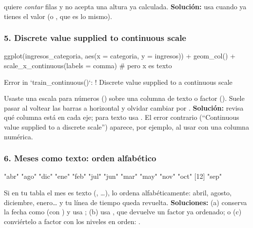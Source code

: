  quiere \emph{contar} filas y no acepta una altura ya
calculada. \textbf{Solución:} usa  cuando ya tienes el
valor (o , que es lo mismo).

\subsubsection{5. Discrete value supplied to continuous scale}

\begin{rnoejecutar}
ggplot(ingresos_categoria, aes(x = categoria, y = ingresos)) +
  geom_col() +
  scale_x_continuous(labels = comma)    # pero x es texto
\end{rnoejecutar}
\begin{rsalida}
Error in `train_continuous()`:
! Discrete value supplied to a continuous scale
\end{rsalida}

Usaste una escala para números () sobre una columna de
texto o factor (). Suele pasar al voltear las barras a
horizontal y olvidar cambiar  por
. \textbf{Solución:} revisa qué columna está en cada
eje; para texto usa . El error contrario
(``Continuous value supplied to a discrete scale'') aparece, por ejemplo, al
usar  con una columna numérica.

\subsubsection{6. Meses como texto: orden alfabético}

\begin{rsalida}
 [1] "abr" "ago" "dic" "ene" "feb" "jul" "jun" "mar" "may" "nov" "oct"
[12] "sep"
\end{rsalida}

Si en tu tabla el mes es texto (, \ldots),
 lo ordena alfabéticamente: abril, agosto, diciembre,
enero\ldots{} y tu línea de tiempo queda revuelta. \textbf{Soluciones:}
(a) conserva la fecha como  (con ) y usa
; (b) usa
, que devuelve un factor ya ordenado; o
(c) conviértelo a factor con los niveles en orden:
.

